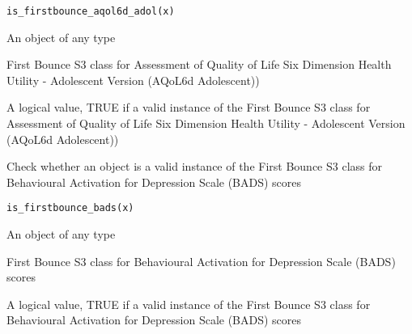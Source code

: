 \documentclass[a4paper]{book}
\begin{document}
%
\begin{Usage}
\begin{verbatim}
is_firstbounce_aqol6d_adol(x)
\end{verbatim}
\end{Usage}
%
\begin{Arguments}
\begin{ldescription}
\item[\code{x}] An object of any type
\end{ldescription}
\end{Arguments}
%
\begin{Details}\relax
First Bounce S3 class for Assessment of Quality of Life Six Dimension Health Utility - Adolescent Version (AQoL6d Adolescent))
\end{Details}
%
\begin{Value}
A logical value, TRUE if a valid instance of the First Bounce S3 class for Assessment of Quality of Life Six Dimension Health Utility - Adolescent Version (AQoL6d Adolescent))
\end{Value}
%
\begin{Description}\relax
Check whether an object is a valid instance of the First Bounce S3 class for Behavioural Activation for Depression Scale (BADS) scores
\end{Description}
%
\begin{Usage}
\begin{verbatim}
is_firstbounce_bads(x)
\end{verbatim}
\end{Usage}
%
\begin{Arguments}
\begin{ldescription}
\item[\code{x}] An object of any type
\end{ldescription}
\end{Arguments}
%
\begin{Details}\relax
First Bounce S3 class for Behavioural Activation for Depression Scale (BADS) scores
\end{Details}
%
\begin{Value}
A logical value, TRUE if a valid instance of the First Bounce S3 class for Behavioural Activation for Depression Scale (BADS) scores
\end{Value}
\end{document}
